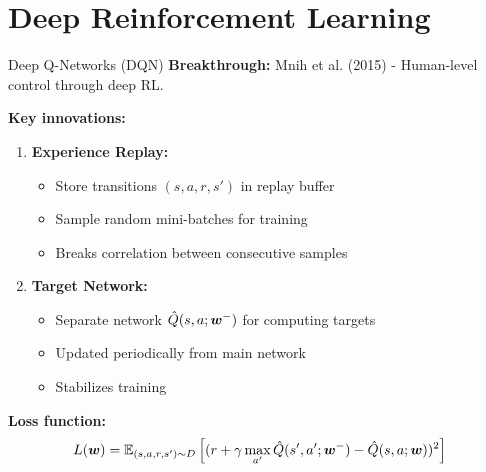 \documentclass[aspectratio=169]{beamer}
\begin{document}
\section{Deep Reinforcement Learning}

\begin{frame}{Deep Q-Networks (DQN)}
  \textbf{Breakthrough:} Mnih et al. (2015) - Human-level control through deep RL.

  \vspace{0.5em}

  \textbf{Key innovations:}

  \begin{enumerate}
    \item \textbf{Experience Replay:}
    \begin{itemize}
      \item Store transitions $(s, a, r, s')$ in replay buffer
      \item Sample random mini-batches for training
      \item Breaks correlation between consecutive samples
    \end{itemize}

    \item \textbf{Target Network:}
    \begin{itemize}
      \item Separate network $\hat{Q}(s,a;\boldsymbol{w}^-)$ for computing targets
      \item Updated periodically from main network
      \item Stabilizes training
    \end{itemize}
  \end{enumerate}

  \vspace{0.5em}

  \textbf{Loss function:}
  $$L(\boldsymbol{w}) = \mathbb{E}_{(s,a,r,s') \sim D}\left[(r + \gamma \max_{a'} \hat{Q}(s',a';\boldsymbol{w}^-) - \hat{Q}(s,a;\boldsymbol{w}))^2\right]$$
\end{frame}
\end{document}
